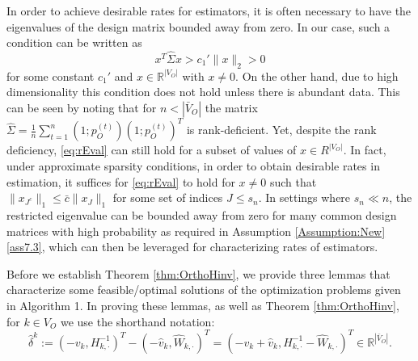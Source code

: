 \documentclass[opre,nonblindrev]{informs3} %
\def\hWkdot{\hat W_{k,\cdot}}
\def\Hinvkdot{H^{-1}_{k,\cdot}}
\begin{document}
\begin{APPENDIX}{}
{In order to achieve desirable rates for  estimators, it is often necessary to have
the eigenvalues of the design matrix 
bounded away from zero.
In our case, such a condition can be written as
\begin{equation}\label{eq:rEval}
x^T \hat\Sigma x > c_1' \|x\|_2>0
\end{equation}
for some constant $c_1'$ and $x\in \mathbb{R}^{|V_O|}$ with $x\neq 0$.
On the other hand, due to high dimensionality this condition does not hold unless there is abundant data. This can be seen by noting that
for $n < |\bar{V}_O|$
the matrix
$\hat\Sigma= \frac{1}{n}\sum_{t=1}^n(1;p_O^{(t)})(1;p_O^{(t)})^T$
is rank-deficient.
Yet,
despite the rank deficiency,
\eqref{eq:rEval}  can still hold for a subset of values of $x \in R^{|V_O|}$.
In fact, under approximate sparsity conditions, 
in order to obtain desirable rates in estimation, 
it suffices for \eqref{eq:rEval} to hold
for $x\neq 0$ such that 
$\|x_{J^c}\|_1  \leq \bar{c}
\|x_J\|_1$ for some set of indices $J \leq s_n$.
In settings where $s_n \ll n$, the restricted eigenvalue can be bounded away from zero for many common design matrices with high probability as required in Assumption 
\ref{Assumption:New}\ref{ass7.3}, which can then be leveraged for characterizing rates of estimators.
}

 


Before we establish Theorem \ref{thm:OrthoHinv}, we provide three lemmas
that characterize some feasible/optimal solutions of the optimization problems given in Algorithm 1.
In proving these lemmas, as well as  Theorem \ref{thm:OrthoHinv},
for $k\in V_O$
 we use the shorthand notation:
 \begin{equation}\label{eq:deltaShortHand}
\hat \delta^k :=
(-v_k,\Hinvkdot)^T-(-\hat{v}_k,\hWkdot )^T=
(-v_k+\hat v_k, \Hinvkdot-\hWkdot)^T\in \mathbb{R}^{|\bar V_O|}. 
 \end{equation}



\end{APPENDIX}
\end{document}
